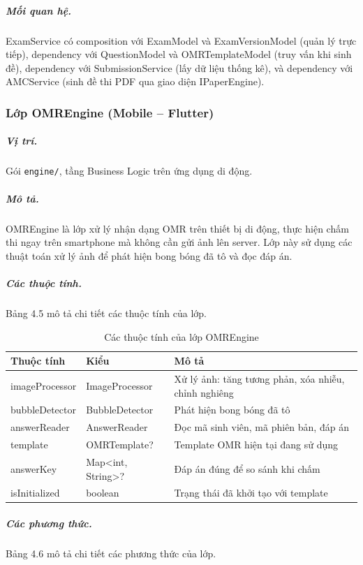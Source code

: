 ﻿\documentclass[../DoAn.tex]{subfiles}
\begin{document}
\subparagraph{Mối quan hệ.} ExamService có composition với ExamModel và ExamVersionModel (quản lý trực tiếp), dependency với QuestionModel và OMRTemplateModel (truy vấn khi sinh đề), dependency với SubmissionService (lấy dữ liệu thống kê), và dependency với AMCService (sinh đề thi PDF qua giao diện IPaperEngine).

\vspace{0.3cm}

\subsubsection{Lớp OMREngine (Mobile -- Flutter)}
\label{subsubsection:4.2.2.3}

\subparagraph{Vị trí.} Gói \texttt{engine/}, tầng Business Logic trên ứng dụng di động.

\subparagraph{Mô tả.} OMREngine là lớp xử lý nhận dạng OMR trên thiết bị di động, thực hiện chấm thi ngay trên smartphone mà không cần gửi ảnh lên server. Lớp này sử dụng các thuật toán xử lý ảnh để phát hiện bong bóng đã tô và đọc đáp án.

\subparagraph{Các thuộc tính.} Bảng 4.5 mô tả chi tiết các thuộc tính của lớp.

\begin{table}[H]
\centering
\begin{tabular}{|p{4cm}|p{3.5cm}|p{5cm}|}
\hline
\textbf{Thuộc tính} & \textbf{Kiểu} & \textbf{Mô tả} \\ \hline
imageProcessor & ImageProcessor & Xử lý ảnh: tăng tương phản, xóa nhiễu, chỉnh nghiêng \\ \hline
bubbleDetector & BubbleDetector & Phát hiện bong bóng đã tô \\ \hline
answerReader & AnswerReader & Đọc mã sinh viên, mã phiên bản, đáp án \\ \hline
template & OMRTemplate? & Template OMR hiện tại đang sử dụng \\ \hline
answerKey & Map\textless int, String\textgreater? & Đáp án đúng để so sánh khi chấm \\ \hline
isInitialized & boolean & Trạng thái đã khởi tạo với template \\ \hline
\end{tabular}
\caption{Các thuộc tính của lớp OMREngine}
\label{table:omr_engine_attrs}
\end{table}

\subparagraph{Các phương thức.} Bảng 4.6 mô tả chi tiết các phương thức của lớp.
\end{document}
